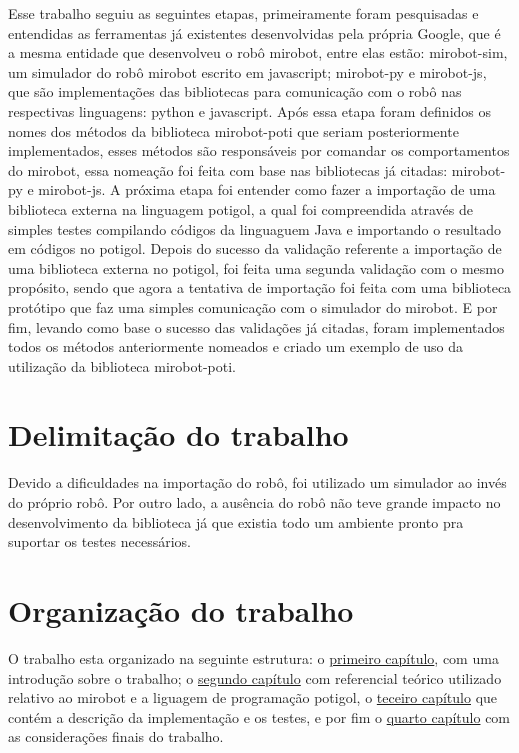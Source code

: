 Esse trabalho seguiu as seguintes etapas, primeiramente foram pesquisadas e
entendidas as ferramentas já existentes desenvolvidas pela própria Google, que
é a mesma entidade que desenvolveu o robô mirobot, entre elas estão:
mirobot-sim, um simulador do robô mirobot escrito em javascript; mirobot-py e
mirobot-js, que são implementações das bibliotecas para comunicação com o robô
nas respectivas linguagens: python e javascript. Após essa etapa foram
definidos os nomes dos métodos da biblioteca mirobot-poti que seriam
posteriormente implementados, esses métodos são responsáveis por comandar os
comportamentos do mirobot, essa nomeação foi feita com base nas bibliotecas já
citadas: mirobot-py e mirobot-js. A próxima etapa foi entender como fazer a
importação de uma biblioteca externa na linguagem potigol, a qual foi
compreendida através de simples testes compilando códigos da linguaguem Java e
importando o resultado em códigos no potigol. Depois do sucesso da validação
referente a importação de uma biblioteca externa no potigol, foi feita uma
segunda validação com o mesmo propósito, sendo que agora a tentativa de
importação foi feita com uma biblioteca protótipo que faz uma simples
comunicação com o simulador do mirobot. E por fim, levando como base o sucesso
das validações já citadas, foram implementados todos os métodos anteriormente
nomeados e criado um exemplo de uso da utilização da biblioteca mirobot-poti.

\section{Delimitação do trabalho}

Devido a dificuldades na importação do robô, foi utilizado um simulador ao
invés do próprio robô. Por outro lado, a ausência do robô não teve grande
impacto no desenvolvimento da biblioteca já que existia todo um ambiente pronto
pra suportar os testes necessários.


\section{Organização do trabalho}

O trabalho esta organizado na seguinte estrutura: o
\hyperref[cap:introducao]{primeiro capítulo}, com uma introdução sobre o
trabalho; o \hyperref[cap:referencial]{segundo capítulo} com referencial
teórico utilizado relativo ao mirobot e a liguagem de programação potigol, o
\hyperref[cap:descricao]{teceiro capítulo} que contém a descrição da
implementação e os testes, e por fim o \hyperref[cap:consideracoes]{quarto
capítulo} com as considerações finais do trabalho.
